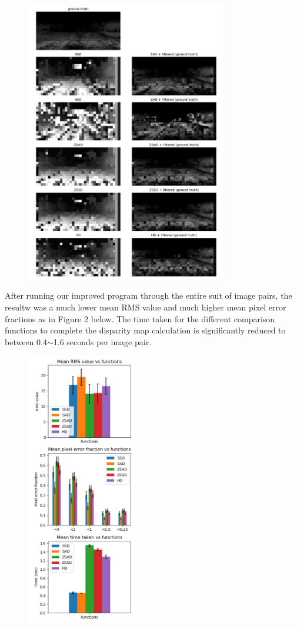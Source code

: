 \documentclass[conference]{IEEEtran}
\begin{document}
\begin{figure}[H]
    \centering
    \includegraphics[width=8.8cm]{702_output_25_50.png}
\end{figure}

After running our improved program through the entire suit of image pairs, the resultw was a much lower mean RMS value and much higher mean pixel error fractions as in Figure 2 below. 
The time taken for the different comparison functions to complete the
disparity map calculation is significantly reduced to between 0.4\(\sim\)1.6 seconds per image pair.

\begin{figure}[H]
    \centering
    \includegraphics[height=12cm]{stats_25_50.png}
\end{figure}
\end{document}
